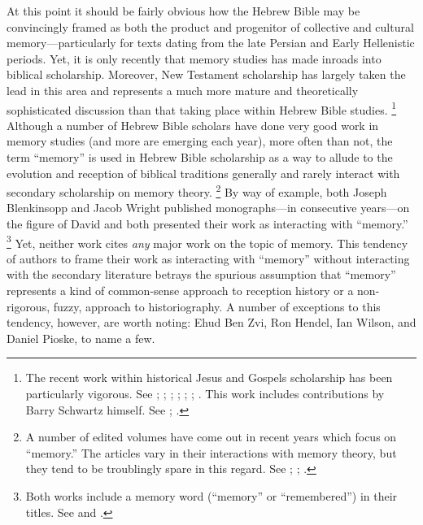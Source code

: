 At this point it should be fairly obvious how the Hebrew Bible may be convincingly framed as both the product and progenitor of collective and cultural memory---particularly for texts dating from the late Persian and Early Hellenistic periods. Yet, it is only recently that memory studies has made inroads into biblical scholarship. Moreover, New Testament scholarship has largely taken the lead in this area and represents a much more mature and theoretically sophisticated discussion than that taking place within Hebrew Bible studies.%
    \footnote{%
        The recent work within historical Jesus and Gospels scholarship has been particularly vigorous. See 
            \cite{keith_ec2015};
            \cite{keith_ec2015b};
            \cite{thatcher2014};
            \cite{rodriguez2010};
            \cite{ledonne2009};
            \cite{hubenthal_carstens-hasselbalch2012};
            \cite{kirk-thatcher2005}. This work includes contributions by Barry Schwartz himself. See 
            \cite{schwartz_kirk-thatcher2005a};
            \cite{schwartz_kirk-thatcher2005b}.}
Although a number of Hebrew Bible scholars have done very good work in memory studies (and more are emerging each year), more often than not, the term ``memory'' is used in Hebrew Bible scholarship as a way to allude to the evolution and reception of biblical traditions generally and rarely interact with secondary scholarship on memory theory.%
    \footnote{%
        A number of edited volumes have come out in recent years which focus on ``memory.'' The articles vary in their interactions with memory theory, but they tend to be troublingly spare in this regard. See 
        \cite{edelman-benzvi2013};
        \cite{benzvi-levin2012};
        \cite{carstens-hasselbalch2012}.}
By way of example, both Joseph Blenkinsopp and Jacob Wright published monographs---in consecutive years---on the figure of David and both presented their work as interacting with ``memory.''%
    \footnote{%
        Both works include a memory word (``memory'' or ``remembered'') in their titles. See \cite{blenkinsopp2013} and \cite{wright2014}.}
Yet, neither work cites \emph{any} major work on the topic of memory. This tendency of authors to frame their work as interacting with ``memory'' without interacting with the secondary literature betrays the spurious assumption that ``memory'' represents a kind of common-sense approach to reception history or a non-rigorous, fuzzy, approach to historiography. A number of exceptions to this tendency, however, are worth noting: Ehud Ben Zvi, Ron Hendel, Ian Wilson, and Daniel Pioske, to name a few.%
